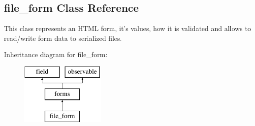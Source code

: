\hypertarget{classfile__form}{\subsection{file\-\_\-form Class Reference}
\label{classfile__form}
}


This class represents an H\-T\-M\-L form, it's values, how it is validated and allows to read/write form data to serialized files.  


Inheritance diagram for file\-\_\-form\-:\begin{figure}[H]
\begin{center}
\leavevmode
\includegraphics[height=3.000000cm]{classfile__form}
\end{center}
\end{figure}
